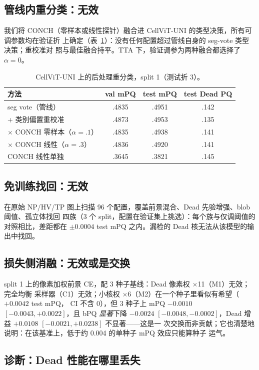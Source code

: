 \documentclass[11pt]{article}
\begin{document}
\subsection{管线内重分类：无效}
我们将 CONCH（零样本或线性探针）融合进 CellViT-UNI 的类型决策，所有可调参数均在验证折
上确定（表~\ref{tab:retype}）：没有任何配置超过管线自身的 seg-vote 类型决策；重校准对
照与最佳融合持平。TTA 下，验证调参为两种融合都选择了 $\alpha=0$。

\begin{table}[t]
\centering\small
\caption{CellViT-UNI 上的后处理重分类，split 1（测试折 3）。}
\label{tab:retype}
\begin{tabular}{lccc}
\toprule
方法 & val mPQ & test mPQ & test Dead PQ \\
\midrule
seg vote（管线）                 & .4835 & .4951 & .142 \\
+ 类别偏置重校准                 & .4873 & .4953 & .135 \\
$\times$ CONCH 零样本（$\alpha{=}.1$） & .4835 & .4938 & .141 \\
$\times$ CONCH 线性（$\alpha{=}.3$）    & .4836 & .4920 & .141 \\
CONCH 线性单独                   & .3645 & .3821 & .145 \\
\bottomrule
\end{tabular}
\end{table}

\subsection{免训练找回：无效}
在原始 NP/HV/TP 图上扫描 96 个配置，覆盖前景混合、Dead 先验增强、blob 阈值、孤立体找回
四族（3 个 split，配置在验证集上挑选）：每个族与仅调阈值的对照相比，差距都在
$\pm0.0004$ test mPQ 之内。漏检的 Dead 核无法从该模型的输出中找回。

\subsection{损失侧消融：无效或是交换}
split 1 上的像素加权前景 CE，配 3 种子基线：Dead 像素权 $\times$11（M1）无效；完全均衡
采样器（C1）无效；小核权 $\times$6（M2）在一个种子里看似有希望（$+0.0042$ test mPQ，
CI 不含 0），但 3 种子上 mPQ $-0.0010$ $[-0.0043,+0.0022]$，且 bPQ \emph{显著}下降
$-0.0024$ $[-0.0048,-0.0002]$，Dead 增益 $+0.0108$ $[-0.0021,+0.0238]$ 不显著——这是一
次交换而非贡献；它也清楚地说明：在该基准上，低于约 0.004 的单种子 mPQ 效应只能算种子
运气。

\subsection{诊断：Dead 性能在哪里丢失}
\label{sec:diagnosis}
\end{document}
